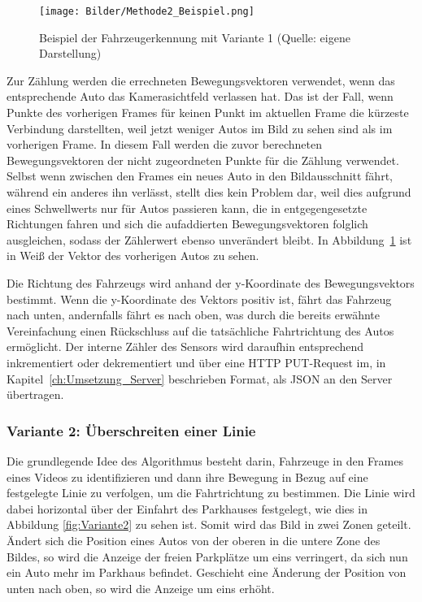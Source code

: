 \begin{figure}[h]
	\myImagePos{}
	\texttt{[image: Bilder/Methode2\_Beispiel.png]}
	\caption[Fahrzeugerkennung Variante 1 Beispiel]{Beispiel der Fahrzeugerkennung mit Variante 1 (Quelle: eigene Darstellung)}
	\label{fig:Variante1}
\end{figure}

Zur Zählung werden die errechneten Bewegungsvektoren verwendet, wenn das entsprechende Auto das Kamerasichtfeld verlassen hat.
Das ist der Fall, wenn Punkte des vorherigen Frames für keinen Punkt im aktuellen Frame die kürzeste Verbindung darstellten, weil jetzt weniger Autos im Bild zu sehen sind als im vorherigen Frame.
In diesem Fall werden die zuvor berechneten Bewegungsvektoren der nicht zugeordneten Punkte für die Zählung verwendet.
Selbst wenn zwischen den Frames ein neues Auto in den Bildausschnitt fährt, während ein anderes ihn verlässt, stellt dies kein Problem dar, weil dies aufgrund eines Schwellwerts nur für Autos passieren kann, die in entgegengesetzte Richtungen fahren und sich die aufaddierten Bewegungsvektoren folglich ausgleichen, sodass der Zählerwert ebenso unverändert bleibt.
In Abbildung~\ref{fig:Variante1} ist in Weiß der Vektor des vorherigen Autos zu sehen.

Die Richtung des Fahrzeugs wird anhand der y-Koordinate des Bewegungsvektors bestimmt.
Wenn die y-Koordinate des Vektors positiv ist, fährt das Fahrzeug nach unten, andernfalls fährt es nach oben, was durch die bereits erwähnte Vereinfachung einen Rückschluss auf die tatsächliche Fahrtrichtung des Autos ermöglicht.
Der interne Zähler des Sensors wird daraufhin entsprechend inkrementiert oder dekrementiert und über eine HTTP PUT-Request im, in Kapitel~\ref{ch:Umsetzung_Server} beschrieben Format, als JSON an den Server übertragen.

\subsubsection{Variante 2: Überschreiten einer Linie}\label{ch:Sensor_v2}

Die grundlegende Idee des Algorithmus besteht darin, Fahrzeuge in den Frames eines Videos zu identifizieren und dann ihre Bewegung in Bezug auf eine festgelegte Linie zu verfolgen, um die Fahrtrichtung zu bestimmen.
Die Linie wird dabei horizontal über der Einfahrt des Parkhauses festgelegt, wie dies in Abbildung \ref{fig:Variante2} zu sehen ist.
Somit wird das Bild in zwei Zonen geteilt.
Ändert sich die Position eines Autos von der oberen in die untere Zone des Bildes, so wird die Anzeige der freien Parkplätze um eins verringert, da sich nun ein Auto mehr im Parkhaus befindet.
Geschieht eine Änderung der Position von unten nach oben, so wird die Anzeige um eins erhöht.

